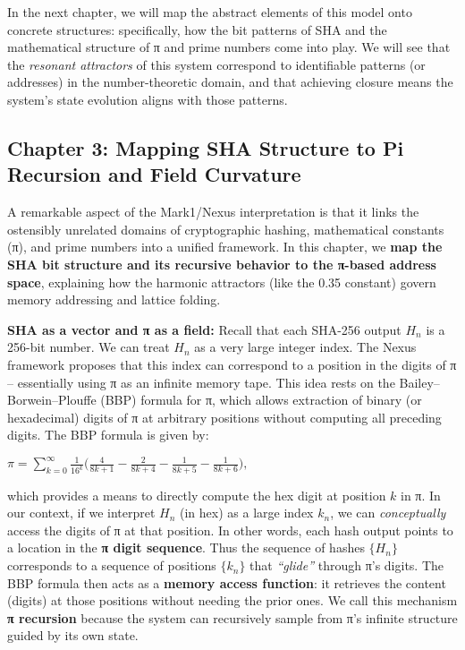\documentclass[11pt]{article}
\begin{document}
In the next chapter, we will map the abstract elements of this model
onto concrete structures: specifically, how the bit patterns of SHA and
the mathematical structure of π and prime numbers come into play. We
will see that the \emph{resonant attractors} of this system correspond
to identifiable patterns (or addresses) in the number-theoretic domain,
and that achieving closure means the system's state evolution aligns
with those patterns.

\hypertarget{chapter-3-mapping-sha-structure-to-pi-recursion-and-field-curvature}{%
\subsection{Chapter 3: Mapping SHA Structure to Pi Recursion and Field
Curvature}\label{chapter-3-mapping-sha-structure-to-pi-recursion-and-field-curvature}}

A remarkable aspect of the Mark1/Nexus interpretation is that it links
the ostensibly unrelated domains of cryptographic hashing, mathematical
constants (π), and prime numbers into a unified framework. In this
chapter, we \textbf{map the SHA bit structure and its recursive behavior
to the π-based address space}, explaining how the harmonic attractors
(like the 0.35 constant) govern memory addressing and lattice folding.

\textbf{SHA as a vector and π as a field:} Recall that each SHA-256
output \(H_n\) is a 256-bit number. We can treat \(H_n\) as a very large
integer index. The Nexus framework proposes that this index can
correspond to a position in the digits of π -- essentially using π as an
infinite memory tape. This idea rests on the Bailey--Borwein--Plouffe
(BBP) formula for π, which allows extraction of binary (or hexadecimal)
digits of π at arbitrary positions without computing all preceding
digits. The BBP formula is given by:

\(\pi = \sum_{k=0}^{\infty} \frac{1}{16^k}\Big(\frac{4}{8k+1} - \frac{2}{8k+4} - \frac{1}{8k+5} - \frac{1}{8k+6}\Big),\)

which provides a means to directly compute the hex digit at position
\(k\) in π. In our context, if we interpret \(H_n\) (in hex) as a large
index \(k_n\), we can \emph{conceptually} access the digits of π at that
position. In other words, each hash output points to a location in the
\textbf{π digit sequence}. Thus the sequence of hashes \(\{H_n\}\)
corresponds to a sequence of positions \(\{k_n\}\) that \emph{``glide''}
through π's digits. The BBP formula then acts as a \textbf{memory access
function}: it retrieves the content (digits) at those positions without
needing the prior ones. We call this mechanism \textbf{π recursion}
because the system can recursively sample from π's infinite structure
guided by its own state.
\end{document}
